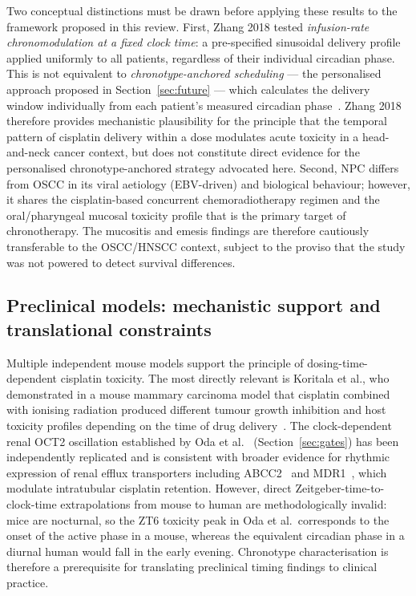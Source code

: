 \documentclass[preprint,review,12pt]{elsarticle}
\begin{document}
Two conceptual distinctions must be drawn before applying these results to
the framework proposed in this review.  First, Zhang 2018 tested
\emph{infusion-rate chronomodulation at a fixed clock time}: a pre-specified
sinusoidal delivery profile applied uniformly to all patients, regardless of
their individual circadian phase.  This is not equivalent to
\emph{chronotype-anchored scheduling} --- the personalised approach proposed
in Section~\ref{sec:future} --- which calculates the delivery window
individually from each patient's measured circadian phase~\cite{Roenneberg2003}.
Zhang 2018 therefore provides mechanistic plausibility for the principle that
the temporal pattern of cisplatin delivery within a dose modulates acute
toxicity in a head-and-neck cancer context, but does not constitute direct
evidence for the personalised chronotype-anchored strategy advocated here.
Second, NPC differs from OSCC in its viral aetiology (EBV-driven) and
biological behaviour; however, it shares the cisplatin-based concurrent
chemoradiotherapy regimen and the oral/pharyngeal mucosal toxicity profile
that is the primary target of chronotherapy.  The mucositis and emesis
findings are therefore cautiously transferable to the OSCC/HNSCC context,
subject to the proviso that the study was not powered to detect survival
differences.

\subsection{Preclinical models: mechanistic support and translational constraints}

Multiple independent mouse models support the principle of
dosing-time-dependent cisplatin toxicity.  The most directly relevant
is Koritala et al., who demonstrated in a mouse mammary carcinoma model
that cisplatin combined with ionising radiation produced different
tumour growth inhibition and host toxicity profiles depending on
the time of drug delivery~\cite{Koritala2022}.  The clock-dependent
renal OCT2 oscillation established by Oda et al.~\cite{Oda2014}
(Section~\ref{sec:gates}) has been independently replicated and is
consistent with broader evidence for rhythmic expression of renal
efflux transporters including ABCC2~\cite{Okyar2011} and MDR1~\cite{Sassa2010},
which modulate intratubular cisplatin retention.
However, direct Zeitgeber-time-to-clock-time extrapolations from
mouse to human are methodologically invalid: mice are nocturnal, so
the ZT6 toxicity peak in Oda et al.\ corresponds to the onset of the
active phase in a mouse, whereas the equivalent circadian phase in a
diurnal human would fall in the early evening.  Chronotype
characterisation is therefore a prerequisite for translating preclinical
timing findings to clinical practice.
\end{document}
